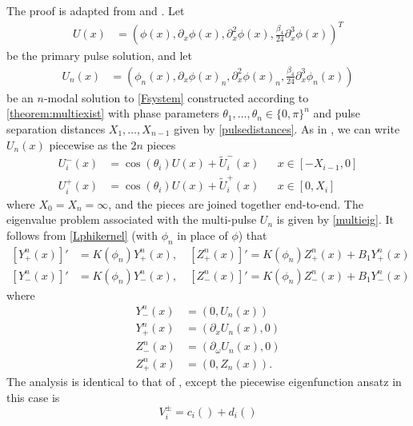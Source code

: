 \documentclass[12pt]{article}
\begin{document}
The proof is adapted from \cite{Manukian} and \cite{Sandstede1998}. Let 
\begin{align*}
U(x) &= (\phi(x), \partial_x \phi(x), \partial_x^2 \phi(x), \frac{\beta_4}{24} \partial_x^3 \phi(x))^T 
\end{align*}
be the primary pulse solution, and let
\begin{align*}
U_n(x) &= (\phi_n(x), \partial_x \phi(x)_n, \partial_x^2 \phi(x)_n, \frac{\beta_4}{24} \partial_x^3 \phi_n(x))
\end{align*}
be an $n$-modal solution to \cref{Fsystem} constructed according to \cref{theorem:multiexist} with phase parameters $\theta_1, \dots, \theta_n \in \{ 0, \pi\}^n$ and pulse separation distances $X_1, \dots, X_{n-1}$ given by \cref{pulsedistances}. As in \cite{Sandstede1998}, we can write $U_n(x)$ piecewise as the $2n$ pieces
\begin{equation}\label{Unpiecewise}
\begin{aligned}
U_i^-(x) &= \cos(\theta_i) U(x) + \tilde{U}_i^-(x) && x \in [-X_{i-1}, 0] \\
U_i^+(x) &=  \cos(\theta_i) U(x) + \tilde{U}_i^+(x) && x \in [0, X_i]
\end{aligned}
\end{equation}
where $X_0 = X_n = \infty$, and the pieces are joined together end-to-end. The eigenvalue problem associated with the multi-pulse $U_n$ is given by \cref{multieig}. It follows from \cref{Lphikernel} (with $\phi_n$ in place of $\phi$) that
\begin{equation}\label{Kkernel}
\begin{aligned}
[Y^n_+(x)]' &= K(\phi_n)Y^n_+(x), \quad [Z^n_+(x)]' = K(\phi_n)Z^n_+(x) + B_1 Y^n_+(x) \\
[Y^n_-(x)]' &= K(\phi_n)Y^n_-(x), \quad [Z^n_-(x)]' = K(\phi_n)Z^n_-(x) + B_1 Y^n_-(x)
\end{aligned}
\end{equation}
where
\begin{equation}
\begin{aligned}
Y^n_-(x) &= ( 0, U_n(x) ) \\
Y^n_+(x) &= ( \partial_x U_n(x), 0) \\
Z^n_-(x) &= ( \partial_\omega U_n(x), 0 ) \\
Z^n_+(x) &= ( 0, Z_n(x) ).
\end{aligned}
\end{equation}
The analysis is identical to that of \cite{Manukian}, except the piecewise eigenfunction ansatz in this case is
\begin{equation}\label{Vansatz}
V_i^\pm = c_i( ) + d_i( )
\end{equation}  











% 

\end{document}
